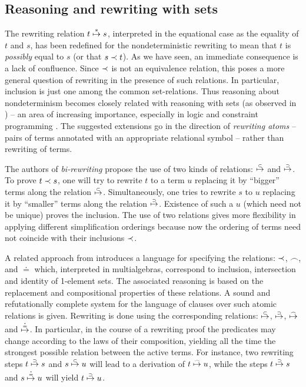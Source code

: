 {\subsection{Reasoning and rewriting with sets}\label{sub:sets} 
The rewriting relation $t\mathrel{\stackrel{*}{\mathrel{\mapsto}}} s$, interpreted in the equational case
as the equality of $t$ and $s$, has been redefined for the
nondeterministic rewriting to mean that $t$ is {\em possibly} equal to
$s$ (or that $s\mathrel{\prec} t$). As we have seen, an immediate consequence is
a lack of confluence. Since $\mathrel{\prec}$ is not an equivalence relation,
this poses a more general question of rewriting in the presence of
such relations. In particular, inclusion is just one among the common
set-relations. Thus reasoning about nondeterminism becomes closely
related with reasoning with sets (as observed in \cite{c:129}) -- an
area of increasing importance, especially in logic and constraint
programming \cite{c:114, c:32, c:61, c:120}. The suggested extensions
go in the direction of {\em rewriting atoms} -- pairs of terms
annotated with an appropriate relational symbol -- rather than
rewriting of terms.

The authors of {\em bi-rewriting\/} \cite{c:72} propose the use of two kinds of relations:  
$\mathrel{\stackrel{{\scriptscriptstyle{\subset}}}{\mathrel{\mapsto}}}$ and $\mathrel{\stackrel{{\scriptscriptstyle{\supset}}}{\mathrel{\mapsto}}}$. To prove $t\mathrel{\prec} s$, one 
will try to rewrite $t$ to a term $u$ replacing it by ``bigger'' terms 
along the relation $\mathrel{\stackrel{{\scriptscriptstyle{\subset}}}{\mathrel{\mapsto}}}$. Simultaneously, one 
tries to rewrite $s$ to $u$ replacing it by ``smaller'' terms along the 
relation $\mathrel{\stackrel{{\scriptscriptstyle{\supset}}}{\mathrel{\mapsto}}}$. Existence of such a $u$ (which 
need not be unique) proves the inclusion. The use of two relations gives more flexibility in applying 
different simplification orderings because now the ordering of terms need not coincide with their 
inclusions $\mathrel{\prec}$.
 
A related approach from \cite{c:69, c:69a} introduces a language for specifying the 
relations: $\mathrel{\prec}$, $\frown$, and $\doteq$ which, 
interpreted in multialgebras, correspond to inclusion, intersection and identity of 1-element sets. The 
associated reasoning is based on the replacement and compositional properties of these relations. A sound 
and refutationally complete system for the language of clauses over such atomic relations is 
given. Rewriting is done using the corresponding relations: 
$\mathrel{\stackrel{{\scriptscriptstyle{\subset}}}{\mathrel{\mapsto}}}$, $\mathrel{\stackrel{{\scriptscriptstyle{\supset}}}{\mathrel{\mapsto}}}$, $\mathrel{\stackrel{{\scriptscriptstyle{\frown}}}{\mathrel{\mapsto}}}$ and $\mathrel{\stackrel{{\scriptscriptstyle{\doteq}}}{\mathrel{\mapsto}}}$. In particular, in the course of a 
rewriting proof the predicates may change according to the laws of their composition, yielding all the 
time the strongest possible relation between the active terms. For instance, two rewriting steps 
$t\mathrel{\stackrel{{\scriptscriptstyle{\supset}}}{\mathrel{\mapsto}}} s$ and $s\mathrel{\stackrel{{\scriptscriptstyle{\subset}}}{\mathrel{\mapsto}}} u$ will lead to a derivation of 
$t\mathrel{\stackrel{{\scriptscriptstyle{\frown}}}{\mathrel{\mapsto}}} u$, while the steps $t\mathrel{\stackrel{{\scriptscriptstyle{\supset}}}{\mathrel{\mapsto}}} s$ and $s\mathrel{\stackrel{{\scriptscriptstyle{\doteq}}}{\mathrel{\mapsto}}} 
u$ will yield $t\mathrel{\stackrel{{\scriptscriptstyle{\supset}}}{\mathrel{\mapsto}}} u$.
 
}
